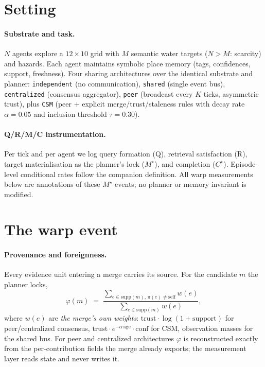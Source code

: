 \documentclass{article}
\newcommand{\method}[1]{\texttt{#1}}
\newcommand{\mstar}{M^{\star}}
\newcommand{\cstar}{C^{\star}}
\begin{document}
\section{Setting}
\label{p2:sec:setting}

\paragraph{Substrate and task.} $N$ agents explore a $12\times10$ grid
with $M$ semantic water targets ($N>M$: scarcity) and hazards. Each
agent maintains symbolic place memory (tags, confidences, support,
freshness). Four sharing architectures over the identical substrate
and planner: \method{independent} (no communication),
\method{shared} (single event bus), \method{centralized} (consensus
aggregator), \method{peer} (broadcast every $K$ ticks, asymmetric
trust), plus \method{CSM} (peer $+$ explicit merge/trust/staleness
rules with decay rate $\alpha{=}0.05$ and inclusion threshold
$\tau{=}0.30$). %

\paragraph{Q/R/M/C instrumentation.} Per tick and per agent we log
query formation (Q), retrieval satisfaction (R), target
materialisation as the planner's lock ($\mstar$), and completion
($\cstar$). Episode-level conditional rates follow the companion
definition. All warp measurements below are annotations of these
$\mstar$ events; no planner or memory invariant is modified.

\section{The warp event}
\label{p2:sec:warp-def}

\paragraph{Provenance and foreignness.} Every evidence unit entering a
merge carries its source. For the candidate $m$ the planner locks,
\[
\varphi(m) \;=\;
\frac{\sum_{e\in\mathrm{supp}(m),\,\pi(e)\neq\mathrm{self}} w(e)}
     {\sum_{e\in\mathrm{supp}(m)} w(e)},
\]
where $w(e)$ are \emph{the merge's own weights}: $\text{trust}\cdot
\log(1{+}\text{support})$ for peer/centralized consensus,
$\text{trust}\cdot e^{-\alpha\,\text{age}}\cdot\text{conf}$ for CSM,
observation masses for the shared bus. For peer and centralized
architectures $\varphi$ is reconstructed exactly from the
per-contribution fields the merge already exports; the measurement
layer reads state and never writes it.
\end{document}
